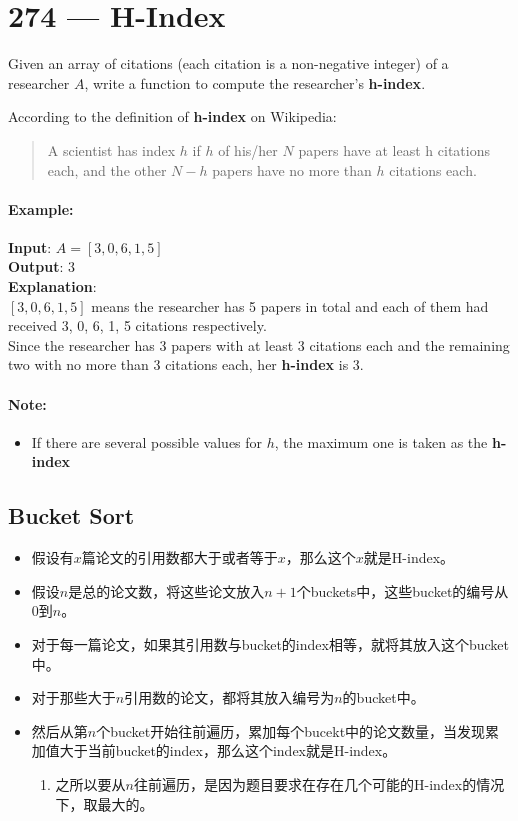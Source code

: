 \section{274 --- H-Index}
Given an array of citations (each citation is a non-negative integer) of a researcher $A$, write a function to compute the researcher's \textbf{h-index}.
\par
According to the definition of \textbf{h-index} on Wikipedia:
\begin{quote}
 A scientist has index $h$ if $h$ of his/her $N$ papers have at least h citations each, and the other $N - h$ papers have no more than $h$ citations each.
\end{quote}

\paragraph{Example:}

\begin{flushleft}
\textbf{Input}: $A = [3,0,6,1,5]$
\\
\textbf{Output}: 3 
\\
\textbf{Explanation}: 
\\
$[3,0,6,1,5]$ means the researcher has 5 papers in total and each of them had received 3, 0, 6, 1, 5 citations respectively. 
\\
Since the researcher has 3 papers with at least 3 citations each and the remaining two with no more than 3 citations each, her \textbf{h-index} is 3.
\end{flushleft}
\paragraph{Note:} 
\begin{itemize}
\item If there are several possible values for $h$, the maximum one is taken as the \textbf{h-index}
\end{itemize}
\subsection{Bucket Sort}
\begin{itemize}
\item 假设有$x$篇论文的引用数都大于或者等于$x$，那么这个$x$就是H-index。
\item 假设$n$是总的论文数，将这些论文放入$n+1$个buckets中，这些bucket的编号从0到$n$。
\item 对于每一篇论文，如果其引用数与bucket的index相等，就将其放入这个bucket中。
\item 对于那些大于$n$引用数的论文，都将其放入编号为$n$的bucket中。
\item 然后从第$n$个bucket开始往前遍历，累加每个bucekt中的论文数量，当发现累加值大于当前bucket的index，那么这个index就是H-index。
\begin{enumerate}
\item 之所以要从$n$往前遍历，是因为题目要求在存在几个可能的H-index的情况下，取最大的。
\end{enumerate}
\end{itemize}

